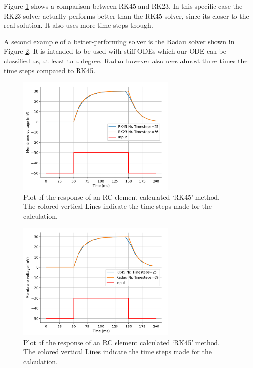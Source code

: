 \documentclass{article}
\begin{document}
    \vspace{10pt}
    Figure \ref{fig:RK45_vs_RK23} shows a comparison between RK45 and RK23.
    In this specific case the RK23 solver actually performs better than the RK45 solver, since its closer to the real solution. It also uses more time steps though.

    \vspace{10pt}
    A second example of a better-performing solver is the Radau solver shown in Figure \ref{fig:RK45_vs_Radau}.
    It is intended to be used with stiff ODEs which our ODE can be classified as, at least to a degree.
    Radau however also uses almost three times the time steps compared to RK45.
    \begin{figure}[h!]
        \centering
        \includegraphics[width=0.7\textwidth]{RK45_vs_RK23.png}
        \caption{Plot of the response of an RC element calculated ‘RK45’ method. The colored vertical Lines indicate the time steps made for the calculation.}
        \label{fig:RK45_vs_RK23}
    \end{figure}
    \begin{figure}[h!]
        \centering
        \includegraphics[width=0.7\textwidth]{RK45_vs_Radau.png}
        \caption{Plot of the response of an RC element calculated ‘RK45’ method. The colored vertical Lines indicate the time steps made for the calculation.}
        \label{fig:RK45_vs_Radau}
    \end{figure}
\end{document}
